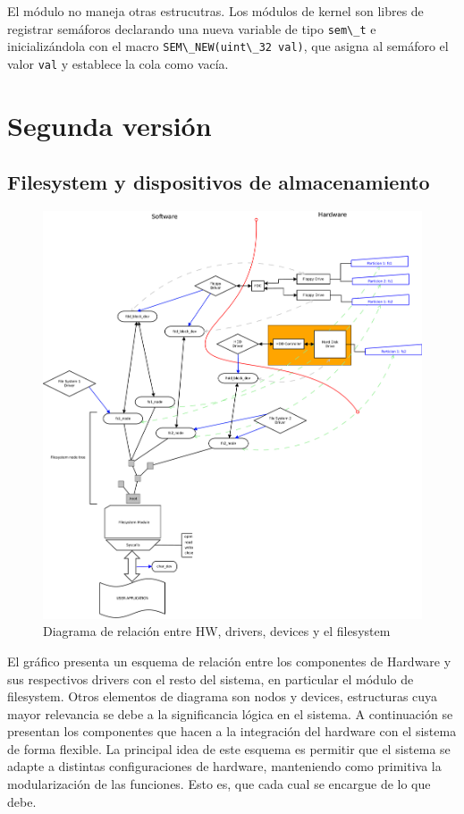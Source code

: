 \documentclass[a4paper]{article}
\newcommand{\func}[1]{\lstinline{#1}}
\begin{document}
El módulo no maneja otras estrucutras. Los módulos de kernel son libres de registrar semáforos declarando una nueva variable de tipo \func{sem\_t} e inicializándola con el macro \func{SEM\_NEW(uint\_32 val)}, que asigna al semáforo el valor \func{val} y establece la cola como vacía. 

\chapter{Segunda versión}

\section{Filesystem y dispositivos de almacenamiento}

\begin{figure}[H]
\hspace{-2cm}
\includegraphics[scale=0.40]{graphics/filesystem-hd.pdf}
\caption{Diagrama de relación entre HW, drivers, devices y el filesystem}
\end{figure}

El gráfico presenta un esquema de relación entre los componentes de Hardware y sus respectivos drivers con el resto del sistema, en particular el módulo de filesystem. Otros elementos de diagrama son nodos y devices, estructuras cuya mayor relevancia se debe a la significancia lógica en el sistema. A continuación se presentan los componentes que hacen a la integración del hardware con el sistema de forma flexible. La principal idea de este esquema es permitir que el sistema se adapte a distintas configuraciones de hardware, manteniendo como primitiva la modularización de las funciones. Esto es, que cada cual se encargue de lo que debe. 
\end{document}
